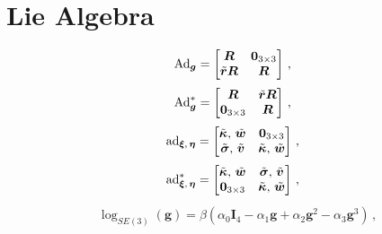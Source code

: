 %
%
\appendix  \label{sec:appendix}
%
%
\section*{Lie Algebra}
\begin{equation} \label{eq:Adjoint_definition}
    \textnormal{Ad}_{\bm{g}} = \begin{bmatrix}
                                    \bm{R} & \bm{0}_{3 \times 3} \\
                                    \tilde{\bm{r}} \bm{R} & \bm{R}
                                \end{bmatrix} \, ,
\end{equation}
\begin{equation} \label{eq:coAdjoint_definition}
\textnormal{Ad}^{*}_{\bm{g}} = \begin{bmatrix}
                                    \bm{R} & \tilde{\bm{r}} \bm{R} \\
                                    \bm{0}_{3 \times 3} & \bm{R}
                                \end{bmatrix} \, ,
\end{equation}
\begin{equation} \label{eq:adjoint_definition}
    \textnormal{ad}_{\bm{\xi}, \, \bm{\eta}} = \begin{bmatrix}
      \tilde{\bm{\kappa}}, \, \tilde{\bm{w}} & \bm{0}_{3 \times 3} \\
      \tilde{\bm{\sigma}}, \, \tilde{\bm{v}} & \tilde{\bm{\kappa}}, \, \tilde{\bm{w}}
    \end{bmatrix} \, ,
\end{equation}
\begin{equation} \label{eq:coadjoint_definition}
    \textnormal{ad}^{*}_{\bm{\xi}, \, \bm{\eta}} = \begin{bmatrix}
      \tilde{\bm{\kappa}}, \, \tilde{\bm{w}} & \tilde{\bm{\sigma}}, \, \tilde{\bm{v}}  \\
      \bm{0}_{3 \times 3} & \tilde{\bm{\kappa}}, \, \tilde{\bm{w}}
    \end{bmatrix} \, ,
\end{equation}
\begin{equation} \label{eq:logSE3_definition}
    \begin{split}
        &\log_{SE(3)} \left(\bm {g}\right) = \beta \left( \alpha_0 \bm{I}_4 - \alpha_1 \bm{g} + \alpha_2 \bm{g}^2 - \alpha_3 \bm{g}^3\right) \, ,
    \end{split}
\end{equation}
